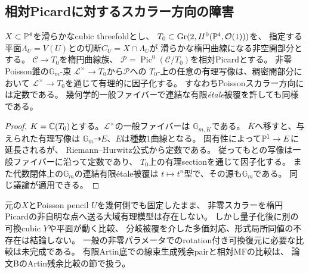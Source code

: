 \subsection{相対Picardに対するスカラー方向の障害}
\begin{proposition}\label{prop:relative-scalar-picard}
$X\subset\mathbb P^4$を滑らかなcubic threefoldとし、
$T_0\subset\operatorname{Gr}(2,H^0(\mathbb P^4,\mathcal O(1)))$を、
指定する平面$\Lambda_U=V(U)$との切断$C_U=X\cap\Lambda_U$が
滑らかな楕円曲線になる非空開部分とする。
$\mathscr C\to T_0$を楕円曲線族、
$\mathscr P=\operatorname{Pic}^0(\mathscr C/T_0)$を相対Picardとする。
非零Poisson錐の$\mathbb G_m$-束
$\mathscr L^\times\to T_0$から$\mathscr P$への
$T_0$-上の任意の有理写像は、稠密開部分において
$\mathscr L^\times\to T_0$を通じて有理的に因子化する。
すなわちPoissonスカラー方向には定数である。
幾何学的一般ファイバーで連結な有限\emph{étale}被覆を許しても同様である。
\end{proposition}
\begin{proof}
$K=\mathbb C(T_0)$とする。$\mathscr L^\times$の一般ファイバーは
$\mathbb G_{m,K}$である。
$\overline K$へ移すと、与えられた有理写像は
$\mathbb G_m\dashrightarrow E$、$E$は種数1曲線となる。
固有性によって$\mathbb P^1\to E$に延長されるが、
Riemann--Hurwitz公式から定数である。
従ってもとの写像は一般ファイバーに沿って定数であり、
$T_0$上の有理sectionを通じて因子化する。
また代数閉体上の$\mathbb G_m$の連結有限étale被覆は
$t\mapsto t^n$型で、その源も$\mathbb G_m$である。
同じ議論が適用できる。
\end{proof}
\begin{remark}[復元への含意と限界]
元の$X$とPoisson pencil $U$を幾何側でも固定したまま、
非零スカラーを楕円Picardの非自明な点へ送る大域有理模型は存在しない。
しかし量子化後に別の可換cubic $Y$や平面が動く比較、
分岐被覆を介した多価対応、形式局所同値の不存在は結論しない。
一般の非零パラメータでのrotation付き可換復元に必要な比較は未完成である。
有限Artin底での線束生成残余pairと相対MFの比較は、
論文BのArtin残余比較の節で扱う。
\end{remark}

